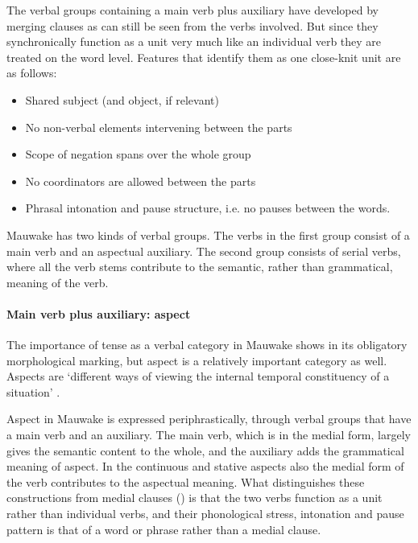 The verbal groups containing a main verb plus auxiliary have developed by merging clauses as can still be seen from the verbs involved. But since they synchronically function as a unit very much like an individual verb they are treated on the word level. Features that identify them as one close-knit unit are as follows:

\begin{itemize}
\item Shared subject (and object, if relevant)
\item No non-verbal elements intervening between the parts
\item Scope of negation spans over the whole group
\item No coordinators are allowed between the parts
\item Phrasal intonation and pause structure, i.e. no pauses between the words.
\end{itemize}

Mauwake has two kinds of verbal groups. The verbs in the first group consist of a main verb and an aspectual auxiliary. The second group consists of serial verbs, where all the verb stems contribute to the semantic, rather than grammatical, meaning of the verb.

\paragraph{Main verb plus auxiliary: aspect}\label{sec:3:a:z:y:x}
{}
The importance of tense as a verbal category in Mauwake shows in its obligatory morphological marking, but aspect is a relatively important category as well. Aspects are `{different ways of viewing the internal temporal constituency of a situation}' \citep[3]{Comrie1976}. 

Aspect in Mauwake is expressed periphrastically, through verbal groups that have a main verb and an auxiliary. The main verb, which is in the medial form, largely gives the semantic content to the whole, and the auxiliary adds the grammatical meaning of aspect. In the continuous and stative aspects also the medial form of the  verb contributes to the aspectual meaning. What distinguishes these constructions from medial clauses () is that the two verbs function as a unit rather than individual verbs, and their phonological stress, intonation and pause pattern is that of a word or phrase rather than a medial clause. 

